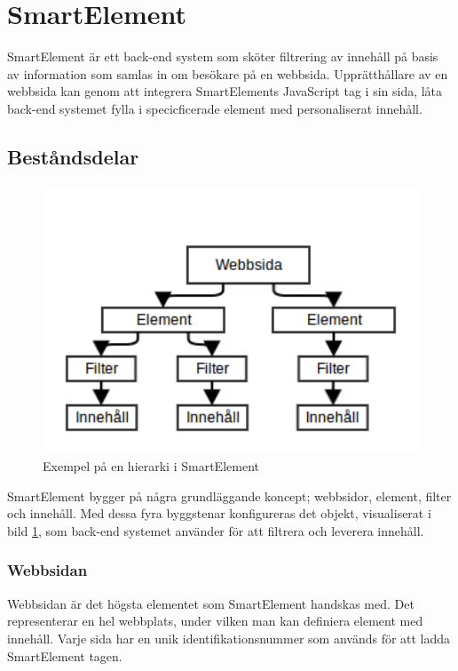 \section{SmartElement}

SmartElement är ett back-end system som sköter filtrering av innehåll på basis av information som samlas in om besökare på en webbsida. Upprätthållare av en webbsida kan genom att integrera SmartElements JavaScript tag i sin sida, låta back-end systemet fylla i specicficerade element med personaliserat innehåll.

\subsection{Beståndsdelar}

\begin{figure}[h!]
\centering
\includegraphics[width=120mm]{assets/images/smelementdatamodelabstract.png}
\caption{Exempel på en hierarki i SmartElement}
\label{abstractstructure}
\end{figure}

SmartElement bygger på några grundläggande koncept; webbsidor, element, filter och innehåll. Med dessa fyra byggstenar konfigureras det objekt, visualiserat i bild \ref{abstractstructure}, som back-end systemet använder för att filtrera och leverera innehåll.

\subsubsection{Webbsidan}

Webbsidan är det högsta elementet som SmartElement handskas med. Det representerar en hel webbplats, under vilken man kan definiera element med innehåll. Varje sida har en unik identifikationsnummer som används för att ladda SmartElement tagen.

